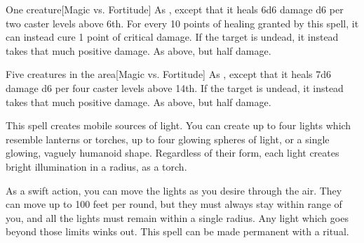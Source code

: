 \spellrng{\rngclose}
\begin{spelltarget}{One creature}[Magic vs. Fortitude]
    \spelleffect As , except that it heals 6d6 damage \add d6 per two caster levels above 6th. For every 10 points of healing granted by this spell, it can instead cure 1 point of critical damage.
    \spellsuccess If the target is undead, it instead takes that much positive damage.
    \spellfailure As above, but half damage.
\end{spelltarget}

\begin{spelltargets}{Five creatures in the area}[Magic vs. Fortitude]
    \spelleffect As , except that it heals 7d6 damage \add d6 per four caster levels above 14th.
    \spellsuccess If the target is undead, it instead takes that much positive damage.
    \spellfailure As above, but half damage.
\end{spelltargets}

\begin{comment}
\subsubsection{D}
\end{comment}

\spelldur{\durshort \dismissable}
\spellline
\spelleffect This spell creates mobile sources of light. You can create up to four lights which resemble lanterns or torches, up to four glowing spheres of light, or a single glowing, vaguely humanoid shape. Regardless of their form, each light creates bright illumination in a \areamed radius, as a torch.

As a swift action, you can move the lights as you desire through the air. They can move up to 100 feet per round, but they must always stay within range of you, and all the lights must remain within a single \areamed radius. Any light which goes beyond those limits winks out.
\spellnotes This spell can be made permanent with a  ritual.

